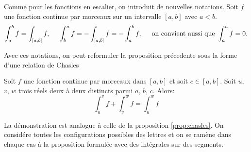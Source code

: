 \begin{nota}
 Comme pour les fonctions en escalier, on introduit de nouvelles notations. Soit $f$ une fonction continue par morceaux sur un intervalle $[a,b]$ avec $a<b$. 
\[
 \int_{a}^bf = \int_{[a,b]}f, \hspace{0.5cm}\int_{b}^af =  - \int_{[a,b]}f =-\int_{a}^bf, \hspace{0.5cm}\text{on convient aussi que } \int_{a}^af =0.
\]
\end{nota}
Avec ces notations, on peut reformuler la proposition précedente sous la forme d'une relation de Chasles
\begin{propn} \label{prop: chaslesCPM}
 Soit $f$ une fonction continue par morceaux dans $[a,b]$ et soit $c\in[a,b]$. Soit $u$, $v$, $w$ trois réels deux à deux distincts parmi $a$, $b$, $c$. Alors:
\begin{displaymath}
 \int_{u}^vf + \int_{v}^wf = \int_{u}^wf 
\end{displaymath}
\end{propn}
\begin{demo}
 La démonstration est analogue à celle de la proposition \ref{prop:chasles}. On considére toutes les configurations possibles des lettres et on se ramène dans chaque cas à la proposition formulée avec des intégrales sur des segments.
\end{demo}

